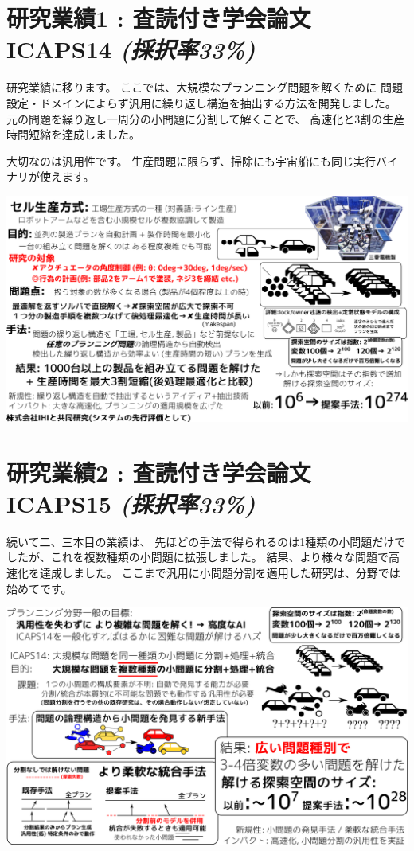 \section{研究業績1 : 査読付き学会論文 ICAPS14 \textbf{\emph{(採択率33\%)}}}
\label{sec-3}

\begin{resume}
研究業績に移ります。
ここでは、大規模なプランニング問題を解くために
問題設定・ドメインによらず汎用に繰り返し構造を抽出する方法を開発しました。
元の問題を繰り返し一周分の小問題に分割して解くことで、
高速化と3割の生産時間短縮を達成しました。

大切なのは汎用性です。
生産問題に限らず、掃除にも宇宙船にも同じ実行バイナリが使えます。
\end{resume}

\includegraphics{img/assemble-icaps14.png}

\section{研究業績2 : 査読付き学会論文 ICAPS15 \textbf{\emph{(採択率33\%)}}}
\label{sec-4}

\begin{resume}
続いて二、三本目の業績は、
先ほどの手法で得られるのは1種類の小問題だけでしたが、これを複数種類の小問題に拡張しました。
結果、より様々な問題で高速化を達成しました。
ここまで汎用に小問題分割を適用した研究は、分野では始めてです。
\end{resume}

\includegraphics{img/assemble-keps14-icaps15.png}

